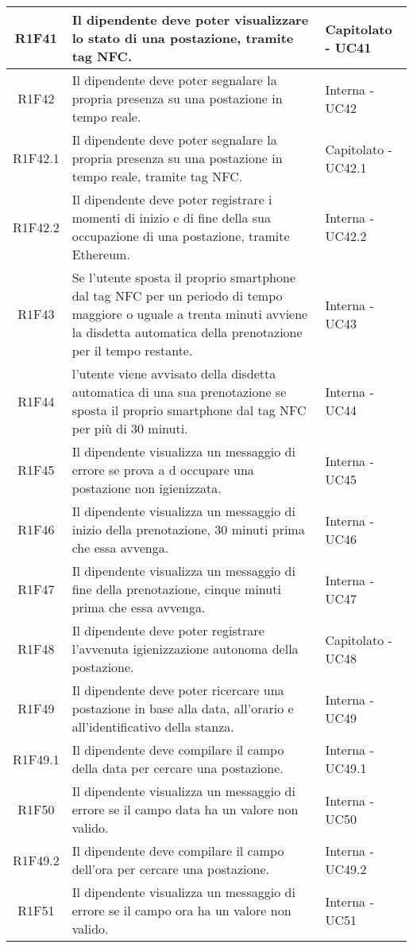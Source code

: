 \begin{center}
\begin{longtable}{|c|p{10cm}|p{4cm}|}
		\hline
		R1F41&Il dipendente deve poter visualizzare lo stato di una postazione, tramite tag NFC.	&Capitolato - UC41 	\\
		\hline
		R1F42 & Il dipendente deve poter segnalare la propria presenza su una postazione in tempo reale. & Interna - UC42 \\
		\hline
		R1F42.1&Il dipendente deve poter segnalare la propria presenza su una postazione in tempo reale, tramite tag NFC.	&Capitolato - UC42.1 	\\
		\hline
		R1F42.2&Il dipendente deve poter registrare i momenti di inizio e di fine della sua occupazione di una postazione, tramite Ethereum.	&Interna - UC42.2 	\\
		\hline
		R1F43&Se l'utente sposta il proprio smartphone dal tag NFC per un periodo di tempo maggiore o uguale a trenta minuti avviene la disdetta automatica della prenotazione per il tempo restante.	&Interna - UC43 	\\
		\hline
		R1F44&l’utente viene avvisato della disdetta automatica di una sua prenotazione se sposta il proprio smartphone dal tag NFC per più di 30 minuti.	&Interna - UC44 	\\
		\hline
		R1F45&Il dipendente visualizza un messaggio di errore se prova a d occupare una postazione non igienizzata. &Interna - UC45 	\\
		\hline	
		R1F46&Il dipendente visualizza un messaggio di inizio della prenotazione, 30 minuti prima che essa avvenga.	&Interna - UC46 	\\
		\hline
		R1F47&Il dipendente visualizza un messaggio di fine della prenotazione, cinque minuti prima che essa avvenga.	&Interna - UC47 	\\
		\hline
		R1F48&Il dipendente deve poter registrare l'avvenuta igienizzazione autonoma della postazione.	&Capitolato - UC48	\\
		\hline	
		R1F49&Il dipendente deve poter ricercare una postazione in base alla data, all'orario e all'identificativo della stanza.	&Interna - UC49	\\
		\hline
			R1F49.1&Il dipendente deve compilare il campo della data per cercare una postazione.	&Interna - UC49.1	\\
		\hline
			R1F50&Il dipendente visualizza un messaggio di errore se il campo data ha un valore non valido.	&Interna - UC50	\\
		\hline
			R1F49.2&Il dipendente deve compilare il campo dell'ora per cercare una postazione.	&Interna - UC49.2	\\
		\hline
			R1F51&Il dipendente visualizza un messaggio di errore se il campo ora ha un valore non valido.	&Interna - UC51	\\

\end{longtable}
\end{center}
